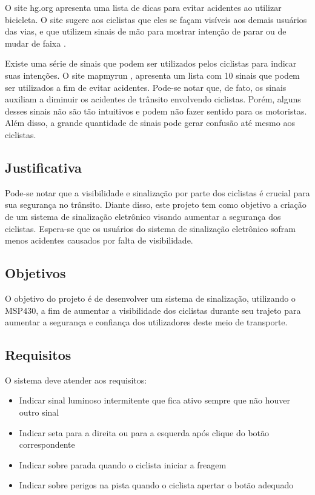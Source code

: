 \documentclass[conference]{IEEEtran}
\begin{document}
O site hg.org apresenta uma lista de dicas para evitar acidentes ao utilizar bicicleta. O site sugere aos ciclistas que eles se façam visíveis aos demais usuários das vias, e que utilizem sinais de mão para mostrar intenção de parar ou de mudar de faixa \cite{b4}. 

Existe uma série de sinais que podem ser utilizados pelos ciclistas para indicar suas intenções. O site mapmyrun \cite{b5}, apresenta um lista com 10 sinais que podem ser utilizados a fim de evitar acidentes. Pode-se notar que, de fato, os sinais auxiliam a diminuir os acidentes de trânsito envolvendo ciclistas. Porém, alguns desses sinais não são tão intuitivos e podem não fazer sentido para os motoristas. Além disso, a grande quantidade de sinais pode gerar confusão até mesmo aos ciclistas. 


\subsection{Justificativa}
Pode-se notar que a visibilidade e sinalização por parte dos ciclistas é crucial para sua segurança no trânsito. Diante disso, este projeto tem como objetivo a criação de um sistema de sinalização eletrônico visando aumentar a segurança dos ciclistas. Espera-se que os usuários do sistema de sinalização eletrônico sofram menos acidentes causados por falta de visibilidade.

\subsection{Objetivos}
O objetivo do projeto é de desenvolver um sistema de sinalização, utilizando o
MSP430, a fim de aumentar a visibilidade dos ciclistas durante seu trajeto para
aumentar a segurança e confiança dos utilizadores deste meio de transporte.

\subsection{Requisitos}
O sistema deve atender aos requisitos:
\begin{itemize}
\item Indicar sinal luminoso intermitente que fica ativo sempre que não houver outro sinal
\item Indicar seta para a direita ou para a esquerda após clique do botão correspondente
\item Indicar sobre parada quando o ciclista iniciar a freagem
\item Indicar sobre perigos na pista quando o ciclista apertar o botão adequado
\end{itemize}
\end{document}
